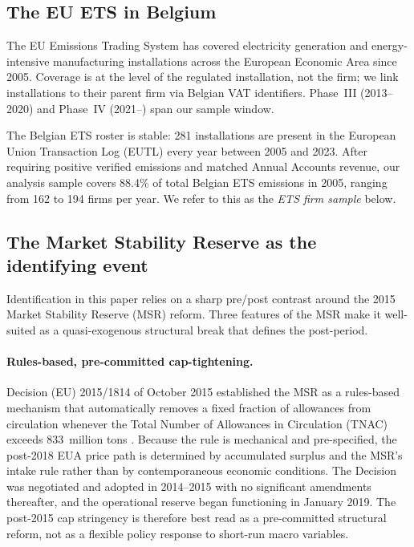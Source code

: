 \subsection{The EU ETS in Belgium}

The EU Emissions Trading System has covered electricity generation and energy-intensive manufacturing installations across the European Economic Area since 2005. Coverage is at the level of the regulated installation, not the firm; we link installations to their parent firm via Belgian VAT identifiers. Phase~III (2013--2020) and Phase~IV (2021--) span our sample window.

The Belgian ETS roster is stable: 281 installations are present in the European Union Transaction Log (EUTL) every year between 2005 and 2023. After requiring positive verified emissions and matched Annual Accounts revenue, our analysis sample covers 88.4\% of total Belgian ETS emissions in 2005, ranging from 162 to 194 firms per year. We refer to this as the \emph{ETS firm sample} below.

\subsection{The Market Stability Reserve as the identifying event}\label{sec:msr_identification}

Identification in this paper relies on a sharp pre/post contrast around the 2015 Market Stability Reserve (MSR) reform. Three features of the MSR make it well-suited as a quasi-exogenous structural break that defines the post-period.

\paragraph{Rules-based, pre-committed cap-tightening.} Decision (EU) 2015/1814 of October 2015 established the MSR as a rules-based mechanism that automatically removes a fixed fraction of allowances from circulation whenever the Total Number of Allowances in Circulation (TNAC) exceeds 833~million tons \citep{Perino2018}. Because the rule is mechanical and pre-specified, the post-2018 EUA price path is determined by accumulated surplus and the MSR's intake rule rather than by contemporaneous economic conditions. The Decision was negotiated and adopted in 2014--2015 with no significant amendments thereafter, and the operational reserve began functioning in January 2019. The post-2015 cap stringency is therefore best read as a pre-committed structural reform, not as a flexible policy response to short-run macro variables.

